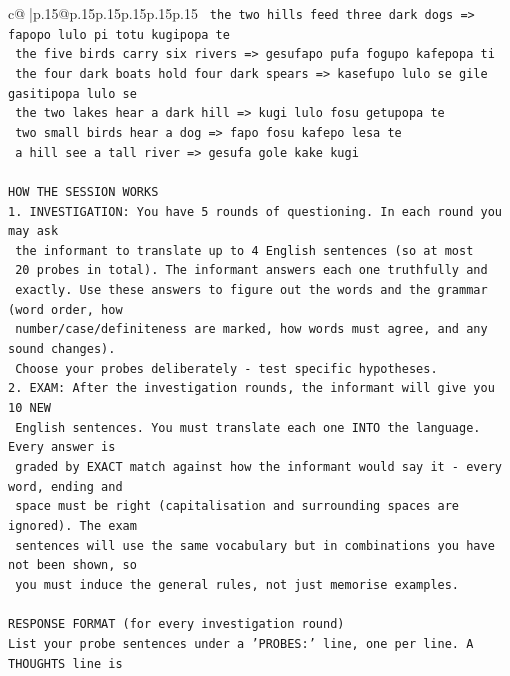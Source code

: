 \documentclass{article}
\begin{document}
{\begin{supertabular}{c@{$\;$}|p{.15\linewidth}@{}p{.15\linewidth}p{.15\linewidth}p{.15\linewidth}p{.15\linewidth}p{.15\linewidth}}
{{{\texttt{    the two hills feed three dark dogs  =>  fapopo lulo pi totu kugipopa te} \\
\texttt{    the five birds carry six rivers  =>  gesufapo pufa fogupo kafepopa ti} \\
\texttt{    the four dark boats hold four dark spears  =>  kasefupo lulo se gile gasitipopa lulo se} \\
\texttt{    the two lakes hear a dark hill  =>  kugi lulo fosu getupopa te} \\
\texttt{    two small birds hear a dog  =>  fapo fosu kafepo lesa te} \\
\texttt{    a hill see a tall river  =>  gesufa gole kake kugi} \\
\\ 
\texttt{HOW THE SESSION WORKS} \\
\texttt{1. INVESTIGATION: You have 5 rounds of questioning. In each round you may ask} \\
\texttt{   the informant to translate up to 4 English sentences (so at most} \\
\texttt{   20 probes in total). The informant answers each one truthfully and} \\
\texttt{   exactly. Use these answers to figure out the words and the grammar (word order, how} \\
\texttt{   number/case/definiteness are marked, how words must agree, and any sound changes).} \\
\texttt{   Choose your probes deliberately {-} test specific hypotheses.} \\
\texttt{2. EXAM: After the investigation rounds, the informant will give you 10 NEW} \\
\texttt{   English sentences. You must translate each one INTO the language. Every answer is} \\
\texttt{   graded by EXACT match against how the informant would say it {-} every word, ending and} \\
\texttt{   space must be right (capitalisation and surrounding spaces are ignored). The exam} \\
\texttt{   sentences will use the same vocabulary but in combinations you have not been shown, so} \\
\texttt{   you must induce the general rules, not just memorise examples.} \\
\\ 
\texttt{RESPONSE FORMAT (for every investigation round)} \\
\texttt{List your probe sentences under a 'PROBES:' line, one per line. A THOUGHTS line is} \\
}}}
\end{supertabular}}
\end{document}
